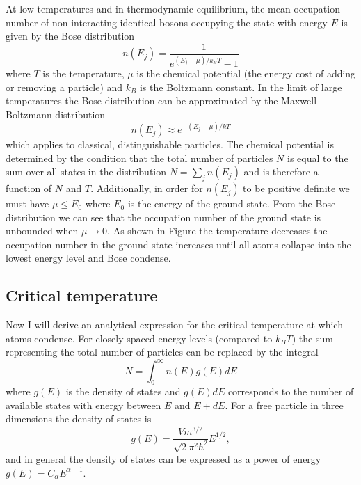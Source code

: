 At low temperatures and in thermodynamic equilibrium, the mean occupation number of non-interacting identical bosons occupying the state with energy $E$ is given by the Bose distribution
%
\begin{equation}
	n(E_j)=\frac{1}{e^{(E_j-\mu)/k_BT}-1}
	\label{eq:Bose_distribution}	
\end{equation}
%
where $T$ is the temperature, $\mu$ is the chemical potential (the energy cost of adding or removing a particle) and $k_B$ is the Boltzmann constant. In the limit of large temperatures the Bose distribution can be approximated by the Maxwell-Boltzmann distribution
%
\begin{equation}
	n(E_j)\approx e^{-(E_j-\mu)/kT}
\end{equation}
%
which applies to classical, distinguishable particles. The chemical potential is determined by the condition that the total number of particles $N$ is equal to the sum over all states in the distribution $N=\sum_jn(E_j)$ and is therefore a function of $N$ and $T$. Additionally, in order for $n(E_j)$ to be positive definite we must have $\mu\leq E_0$ where $E_0$ is the energy of the ground state. From the Bose distribution we can see that the occupation number of the ground state is unbounded when $\mu\rightarrow0$. As shown in Figure  the temperature decreases the occupation number in the ground state increases until all atoms collapse into the lowest energy level and Bose condense. 

\subsection{Critical temperature}
Now I will derive an analytical expression for the critical temperature at which atoms condense. For closely spaced energy levels (compared to $k_B T$) the sum representing the total number of particles can be replaced by the integral
%
\begin{equation}
	N=\int_0^\infty n(E) g(E) dE
	\label{eq:N(E)}
\end{equation}
%
where $g(E)$ is the density of states and $g(E)dE$ corresponds to the number of available states with energy between $E$ and $E+dE$. For a free particle in three dimensions the density of states is
%
\begin{equation}
	g(E)=\frac{V m^{3/2}}{\sqrt{2}\pi^2\hbar^2}E^{1/2},
	\label{eq:free_particle_dos}
\end{equation}
%
and in general the density of states can be expressed as a power of energy $g(E)=C_\alpha E^{\alpha-1}$. 

